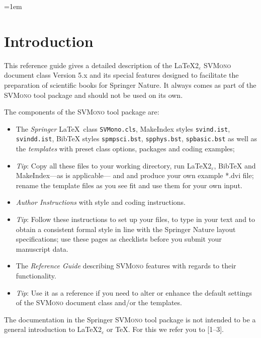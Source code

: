 \documentclass[graybox,square]{svmono}
\begin{document}
\begin{sloppy}

\parindent=0pt%
\parskip=1em%

\clearpage

\def\thesection{\arabic{section}}
\section{Introduction}\label{sec:1}
%
This reference guide gives a detailed description of the \LaTeX2$_{\varepsilon}$ \textsc{SVMono} document class Version 5.x and its special features designed to facilitate the preparation of scientific books for Springer Nature. It always comes as part of the \textsc{SVMono} tool package and should not be used on its own.

The components of the \textsc{SVMono} tool package are:
%
\begin{itemize}
\item The \textit{Springer} \LaTeX~class \verb|SVMono.cls|, MakeIndex styles \texttt{svind.ist}, \texttt{svindd.ist}, BibTeX styles \texttt{spmpsci.bst}, \texttt{spphys.bst}, \texttt{spbasic.bst}{\break} as well as the \textit{templates} with preset class options, packages and coding examples;
%
\item[]\textit{Tip}: Copy all these files to your working directory, run \LaTeX2$_{\varepsilon}$, BibTeX and MakeIndex---as is applicable--- and and produce your own example *.dvi file; rename the template files as you see fit and use them for your own input.
%
\item \textit{Author Instructions} with style and coding instructions.
%
\item[]\textit{Tip}: Follow these instructions to set up your files, to type in your text and to obtain a consistent formal style in line with the Springer Nature layout specifications; use these pages as checklists before you submit your manuscript data.
%
\item The \textit{Reference Guide} describing \textsc{SVMono} features with regards to their functionality.
%
\item[]\textit{Tip}: Use it as a reference if you need to alter or enhance the default settings of the \textsc{SVMono} document class and/or the templates.
\end{itemize}
%

The documentation in the Springer \textsc{SVMono} tool package is not intended to be a general introduction to \LaTeX2$_{\varepsilon}$ or \TeX. For this we refer you to [1--3].


\end{sloppy}
\end{document}
